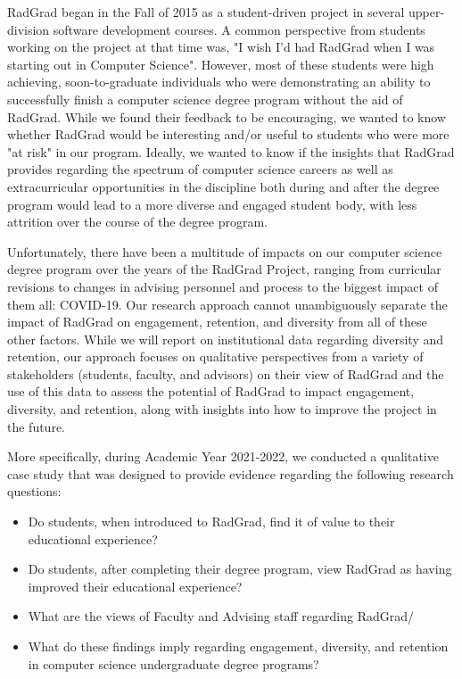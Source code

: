 \documentclass[acmsmall]{acmart}
\begin{document}
RadGrad began in the Fall of 2015 as a student-driven project in several upper-division software development courses.  A common perspective from students working on the project at that time was, "I wish I'd had RadGrad when I was starting out in Computer Science".  However, most of these students were high achieving, soon-to-graduate individuals who were demonstrating an ability to successfully finish a computer science degree program without the aid of RadGrad.  While we found their feedback to be encouraging, we wanted to know whether RadGrad would be interesting and/or useful to students who were more "at risk" in our program. Ideally, we wanted to know if the insights that RadGrad provides regarding the spectrum of computer science careers as well as extracurricular opportunities in the discipline both during and after the degree program would lead to a more diverse and engaged student body, with less attrition over the course of the degree program.

Unfortunately, there have been a multitude of impacts on our computer science degree program over the years of the RadGrad Project, ranging from curricular revisions to changes in advising personnel and process to the biggest impact of them all: COVID-19.  Our research approach cannot unambiguously separate the impact of RadGrad on engagement, retention, and diversity from all of these other factors.  While we will report on institutional data regarding diversity and retention, our approach focuses on qualitative perspectives from a variety of stakeholders (students, faculty, and advisors) on their view of RadGrad and the use of this data to assess the potential of RadGrad to impact engagement, diversity, and retention, along with insights into how to improve the project in the future.

More specifically, during Academic Year 2021-2022, we conducted a qualitative case study that was designed to provide evidence regarding the following research questions:

\begin{itemize}
\item Do students, when introduced to RadGrad, find it of value to their educational experience?
\item Do students, after completing their degree program, view RadGrad as having improved their educational experience?
\item What are the views of Faculty and Advising staff regarding RadGrad/
\item What do these findings imply regarding engagement, diversity, and retention in computer science undergraduate degree programs?
\end{itemize}
\end{document}
